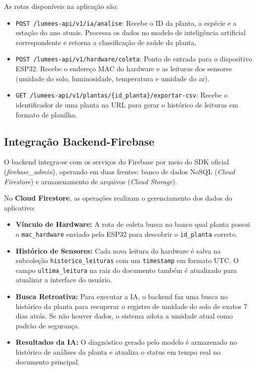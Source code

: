 \documentclass[
	12pt,
	article,
	oneside,
	a4paper,
	english,
	brazil
	]{abntex2}
\begin{document}
As rotas disponíveis na aplicação são:

\begin{itemize}
    \item \texttt{POST /lumees-api/v1/ia/analise}: Recebe o ID da planta, a espécie e a estação do ano atuais. Processa os dados no modelo de inteligência artificial correspondente e retorna a classificação de saúde da planta.
    \item \texttt{POST /lumees-api/v1/hardware/coleta}: Ponto de entrada para o dispositivo ESP32. Recebe o endereço MAC do hardware e as leituras dos sensores (umidade do solo, luminosidade, temperatura e umidade do ar).
    \item \texttt{GET /lumees-api/v1/plantas/\{id\_planta\}/exportar-csv}: Recebe o identificador de uma planta na URL para gerar o histórico de leituras em formato de planilha.
\end{itemize}

\subsection{Integração Backend-Firebase}
O backend integra-se com os serviços do Firebase por meio do SDK oficial (\textit{firebase\_admin}), operando em duas frentes: banco de dados NoSQL (\textit{Cloud Firestore}) e armazenamento de arquivos (\textit{Cloud Storage}).

No \textbf{Cloud Firestore}, as operações realizam o gerenciamento dos dados do aplicativo:

\begin{itemize}
    \item \textbf{Vínculo de Hardware:} A rota de coleta busca no banco qual planta possui o \texttt{mac\_hardware} enviado pelo ESP32 para descobrir o \texttt{id\_planta} correto.
    \item \textbf{Histórico de Sensores:} Cada nova leitura do hardware é salva na subcoleção \texttt{historico\_leituras} com um \texttt{timestamp} em formato UTC. O campo \texttt{ultima\_leitura} na raiz do documento também é atualizado para atualizar a interface do usuário.
    \item \textbf{Busca Retroativa:} Para executar a IA, o backend faz uma busca no histórico da planta para recuperar o registro de umidade do solo de exatos 7 dias atrás. Se não houver dados, o sistema adota a umidade atual como padrão de segurança.
    \item \textbf{Resultados da IA:} O diagnóstico gerado pelo modelo é armazenado no histórico de análises da planta e atualiza o status em tempo real no documento principal.
\end{itemize}
\end{document}

